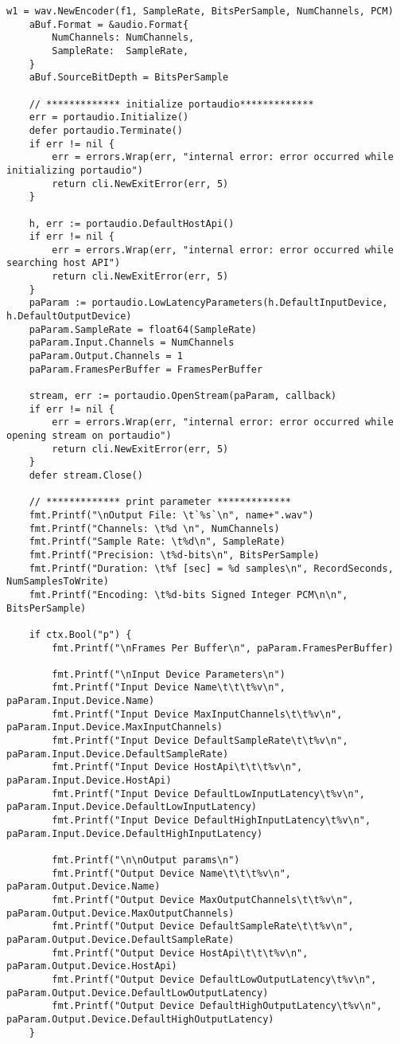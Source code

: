 \begin{lstlisting}[caption=cmd/multirecord/multirecord.go,label=multirecord/multirecord]
	w1 = wav.NewEncoder(f1, SampleRate, BitsPerSample, NumChannels, PCM)
	aBuf.Format = &audio.Format{
		NumChannels: NumChannels,
		SampleRate:  SampleRate,
	}
	aBuf.SourceBitDepth = BitsPerSample

	// ************* initialize portaudio*************
	err = portaudio.Initialize()
	defer portaudio.Terminate()
	if err != nil {
		err = errors.Wrap(err, "internal error: error occurred while initializing portaudio")
		return cli.NewExitError(err, 5)
	}

	h, err := portaudio.DefaultHostApi()
	if err != nil {
		err = errors.Wrap(err, "internal error: error occurred while searching host API")
		return cli.NewExitError(err, 5)
	}
	paParam := portaudio.LowLatencyParameters(h.DefaultInputDevice, h.DefaultOutputDevice)
	paParam.SampleRate = float64(SampleRate)
	paParam.Input.Channels = NumChannels
	paParam.Output.Channels = 1
	paParam.FramesPerBuffer = FramesPerBuffer

	stream, err := portaudio.OpenStream(paParam, callback)
	if err != nil {
		err = errors.Wrap(err, "internal error: error occurred while opening stream on portaudio")
		return cli.NewExitError(err, 5)
	}
	defer stream.Close()

	// ************* print parameter *************
	fmt.Printf("\nOutput File: \t`%s`\n", name+".wav")
	fmt.Printf("Channels: \t%d \n", NumChannels)
	fmt.Printf("Sample Rate: \t%d\n", SampleRate)
	fmt.Printf("Precision: \t%d-bits\n", BitsPerSample)
	fmt.Printf("Duration: \t%f [sec] = %d samples\n", RecordSeconds, NumSamplesToWrite)
	fmt.Printf("Encoding: \t%d-bits Signed Integer PCM\n\n", BitsPerSample)

	if ctx.Bool("p") {
		fmt.Printf("\nFrames Per Buffer\n", paParam.FramesPerBuffer)

		fmt.Printf("\nInput Device Parameters\n")
		fmt.Printf("Input Device Name\t\t\t%v\n", paParam.Input.Device.Name)
		fmt.Printf("Input Device MaxInputChannels\t\t%v\n", paParam.Input.Device.MaxInputChannels)
		fmt.Printf("Input Device DefaultSampleRate\t\t%v\n", paParam.Input.Device.DefaultSampleRate)
		fmt.Printf("Input Device HostApi\t\t\t%v\n", paParam.Input.Device.HostApi)
		fmt.Printf("Input Device DefaultLowInputLatency\t%v\n", paParam.Input.Device.DefaultLowInputLatency)
		fmt.Printf("Input Device DefaultHighInputLatency\t%v\n", paParam.Input.Device.DefaultHighInputLatency)

		fmt.Printf("\n\nOutput params\n")
		fmt.Printf("Output Device Name\t\t\t%v\n", paParam.Output.Device.Name)
		fmt.Printf("Output Device MaxOutputChannels\t\t%v\n", paParam.Output.Device.MaxOutputChannels)
		fmt.Printf("Output Device DefaultSampleRate\t\t%v\n", paParam.Output.Device.DefaultSampleRate)
		fmt.Printf("Output Device HostApi\t\t\t%v\n", paParam.Output.Device.HostApi)
		fmt.Printf("Output Device DefaultLowOutputLatency\t%v\n", paParam.Output.Device.DefaultLowOutputLatency)
		fmt.Printf("Output Device DefaultHighOutputLatency\t%v\n", paParam.Output.Device.DefaultHighOutputLatency)
	}


\end{lstlisting}
